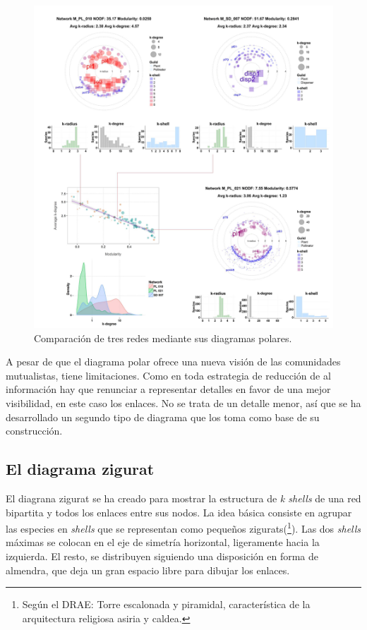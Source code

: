 \begin{figure}[h!]
\centering
\includegraphics[scale=0.75]{Figures/VIS_Modvskdegree3.PDF}
\caption[PolarExample]{Comparación de tres redes mediante sus diagramas polares.}
\label{fig:VIS_Modvskdegree3}
\end{figure}

A pesar de que el diagrama polar ofrece una nueva visión de las comunidades mutualistas, tiene limitaciones. Como en toda estrategia de reducción de al información hay que renunciar a representar detalles en favor de una mejor visibilidad, en este caso los enlaces. No se trata de un detalle menor, así que se ha desarrollado un segundo tipo de diagrama que los toma como base de su construcción.

\subsection{El diagrama zigurat}

El diagrana zigurat se ha creado para mostrar la estructura de \textit{k shells} de una red bipartita y todos los enlaces entre sus nodos. La idea básica consiste en agrupar las especies en \textit{shells} que se representan como pequeños zigurats(\footnote{Según el DRAE: Torre escalonada y piramidal, característica de la arquitectura religiosa asiria y caldea.}). Las dos \textit{shells} máximas se colocan en el eje de simetría horizontal, ligeramente hacia la izquierda. El resto, se distribuyen siguiendo una disposición en forma de almendra, que deja un gran espacio libre para dibujar los enlaces.

